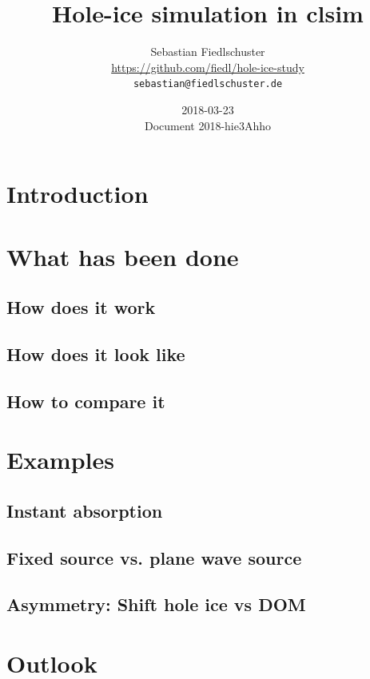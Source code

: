 \documentclass[green, 12pt]{beamer}
\title{Hole-ice simulation in clsim}
\date{2018-03-23 \\ \vspace*{2mm} \tiny{Document 2018-hie3Ahho}}
\author[Sebastian Fiedlschuster \texttt{<sebastian@fiedlschuster.de>}]{Sebastian Fiedlschuster \\ \tiny{\url{https://github.com/fiedl/hole-ice-study}} \\ \tiny\texttt{sebastian@fiedlschuster.de}}
\institute{Erlangen Centre for Astroparticle Physics}
\newif\ifplacelogo %
\begin{document}



\section{Introduction}
  
  
\placelogofalse

\section{What has been done}
\subsection{How does it work}
  
  
\subsection{How does it look like}
  
\subsection{How to compare it}
  

\section{Examples}
\subsection{Instant absorption}
  
  
\subsection{Fixed source vs. plane wave source}
  
  
\subsection{Asymmetry: Shift hole ice vs DOM}
  

\section{Outlook}
\end{document}
